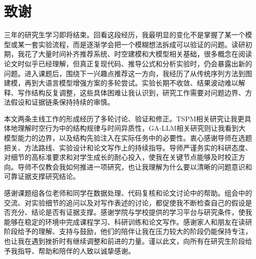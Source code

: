 \chapter*{致谢}

三年的研究生学习即将结束。回看这段经历，我最明显的变化不是掌握了某一个模型或某一套实验流程，而是逐渐学会把一个模糊想法拆成可以验证的问题。读研初期，我花了大量时间补齐推荐系统、时空建模和大模型相关基础，很多概念在阅读论文时似乎已经理解，但真正复现代码、推导公式和分析实验时，仍会暴露出新的问题。进入课题后，围绕下一兴趣点推荐这一方向，我经历了从传统序列方法到图建模，再到大语言模型增强方案的多轮尝试。实验长期不收敛、结果波动难以解释、写作结构反复调整，这些具体困难让我认识到，研究工作需要对问题边界、方法假设和证据链条保持持续的审慎。

本文两条主线工作的形成经历了多轮讨论、验证和修正。TSPM相关研究让我更具体地理解时空行为中的结构规律与时间异质性，GA-LLM相关研究则让我看到大模型能力的边界，以及结构先验注入在实际任务中的必要性。衷心感谢导师在选题把关、方法路线、实验设计和论文写作上的持续指导。导师严谨务实的科研态度、对细节的高标准要求和对学生成长的耐心投入，使我在关键节点能够及时校正方向。导师不仅教会我如何推进一项研究，也让我理解为什么要以清晰的问题意识和可靠证据支撑研究结论。

感谢课题组各位老师和同学在数据处理、代码复核和论文讨论中的帮助。组会中的交流、对实验细节的追问以及对写作表述的讨论，都促使我不断检查自己的假设是否充分、结论是否有证据支撑。感谢学院与学校提供的学习平台与研究条件，使我能够在稳定的环境中完成课程学习、科研训练和论文写作。感谢家人和朋友在读研阶段给予的理解、支持与鼓励，他们的陪伴让我在压力较大的阶段仍能保持专注，也让我在遇到挫折时有继续调整和前进的力量。谨以此文，向所有在研究生阶段给予我指导、帮助和陪伴的人致以诚挚感谢。

\pagestyle{thesisnormal}
